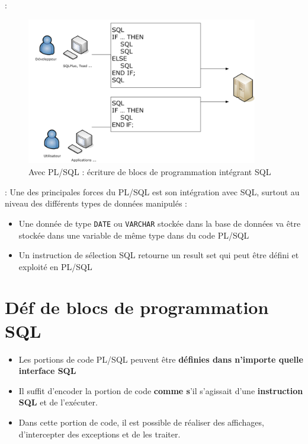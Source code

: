 \documentclass[10pt]{beamer}
\begin{document}
\begin{frame}{\secname : \subsecname}
    \begin{figure}
        \begin{center}
            \includegraphics[width=0.9\textwidth]{../assets/img/envoi_instruction-2.png}
            \caption{Avec PL/SQL : écriture de blocs de programmation intégrant SQL}
        \end{center}
    \end{figure}
\end{frame}

\begin{frame}{\secname : \subsecname}
    Une des principales forces du PL/SQL est son intégration avec SQL, surtout au niveau des différents types de données manipulés :
    \begin{itemize}
        \item Une donnée de type \lstinline[language=plsql]!DATE! ou \lstinline[language=plsql]!VARCHAR! stockée dans la base de données va être stockée dans une variable de même type dans du code PL/SQL
        \item Un instruction de sélection SQL retourne un result set qui peut être défini et exploité en PL/SQL
    \end{itemize}
\end{frame}

\section{Déf de blocs de programmation SQL}
\begin{frame}{\secname}
    \begin{itemize}
        \item Les portions de code PL/SQL peuvent être \textbf{définies dans n'importe quelle interface SQL}
        \item Il suffit d'encoder la portion de code \textbf{comme s}'il s'agissait d'une \textbf{instruction SQL} et de l'exécuter.
        \item Dans cette portion de code, il est possible de réaliser des affichages, d'intercepter des exceptions et de les traiter.
    \end{itemize}
\end{frame}
\end{document}
